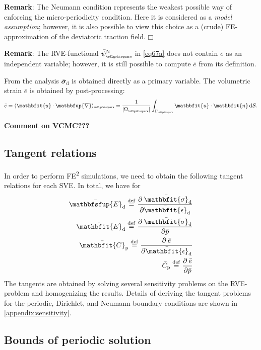 \documentclass[12pt,a4paper]{article}
\renewcommand{\ta}[1]{\mathbfit{#1}}
\renewcommand{\ts}[1]{\mathbfit{#1}}
\renewcommand{\tf}[1]{\mathbfsfup{#1}}
\renewcommand{\diff}{\mathbfup{\nabla}}
\renewcommand{\Box}{\mdlgwhtsquare}
\DeclarePairedDelimiter{\homgen}{\langle}{\rangle_\rve}
\renewcommand{\dev}{\mathrm{d}}
\newcommand{\volume}{|\Omega_\rve|}
\newcommand{\ded}{\mathrm{d}}
\newcommand{\dep}{\mathrm{p}}
\newcommand{\rve}{
  {\mathchoice
   {\mbox{\scalebox{0.67}{$\Box$}}}
   {\mbox{\scalebox{0.67}{$\Box$}}}
   {\mbox{\scalebox{0.5}{$\Box$}}}
   {\mbox{\scalebox{0.375}{$\Box$}}}
  }
}
\begin{document}
\textbf{Remark}: The Neumann condition represents the weakest possible way of enforcing the micro-periodicity condition.
Here it is considered as a \emph{model assumption}; however, it is also possible to view this choice as a (crude) FE-approximation of the deviatoric traction field. $\Box$

\textbf{Remark}: The RVE-functional $\bar{\psi}_\rve^\Neumann$ in \cref{eq67a} does not contain $\bar{e}$ as an independent variable; however, it is still possible to compute $\bar{e}$ from its definition.

From the analysis $\bar{\ts\sigma}_\dev$ is obtained directly as a primary variable.
The volumetric strain $\bar{e}$ is obtained by post-processing:
\begin{align}
 \bar{e} = \homgen{\ta u\cdot\diff} = \frac{1}{\volume} \int_{\Gamma_\rve} \ta u \cdot \ta n\dif S.
\end{align}

\textbf{Comment on VCMC???} 


\subsection{Tangent relations}
In order to perform FE\textsuperscript{2} simulations, we need to obtain the following tangent relations for each SVE.
In total, we have for 
\begin{subequations}
\label{eq:macro_tangents}
\begin{align}
 \bar{\tf E}_\ded \defeq \pd{\bar{\ts\sigma}_\dev}{\bar{\ts\epsilon}_\dev}\\
 \bar{\ts E}_\ded \defeq \pd{\bar{\ts\sigma}_\dev}{\bar{p}}\\
 \bar{\ts C}_\dep \defeq \pd{\bar{e}}{\bar{\ts\epsilon}_\dev}\\
 \bar{C}_\dep \defeq \pd{\bar{e}}{\bar{p}}
\end{align}
\end{subequations}
The tangents are obtained by solving several sensitivity problems on the RVE-problem and homogenizing the results.
Details of deriving the tangent problems for the periodic, Dirichlet, and Neumann boundary conditions are shown in \cref{appendix:sensitivity}.




\subsection{Bounds of periodic solution}
\end{document}

